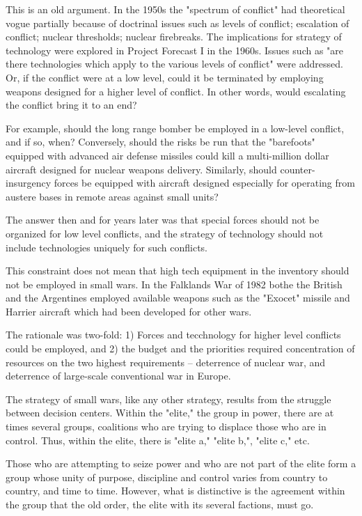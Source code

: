 This is an old argument. In the 1950s the "spectrum of conflict" had theoretical vogue partially because of doctrinal issues such as levels of conflict; escalation of conflict; nuclear thresholds; nuclear firebreaks. The implications for strategy of technology were explored in Project Forecast I in the 1960s. Issues such as "are there technologies which apply to the various levels of conflict" were addressed. Or, if the conflict were at a low level, could it be terminated by employing weapons designed for a higher level of conflict. In other words, would escalating the conflict bring it to an end?

For example, should the long range bomber be employed in a low-level conflict, and if so, when? Conversely, should the risks be run that the "barefoots" equipped with advanced air defense missiles could kill a multi-million dollar aircraft designed for nuclear weapons delivery. Similarly, should counter-insurgency forces be equipped with aircraft designed especially for operating from austere bases in remote areas against small units?

The answer then and for years later was that special forces should not be organized for low level conflicts, and the strategy of technology should not include technologies uniquely for such conflicts.

\begin{mdframed}[backgroundcolor=black!10]
This constraint does not mean that high tech equipment in the inventory should not be employed in small wars. In the Falklands War of 1982 bothe the British and the Argentines employed available weapons such as the "Exocet" missile and Harrier aircraft which had been developed for other wars.
\end{mdframed}

The rationale was two-fold: 1) Forces and tecchnology for higher level conflicts could be employed, and 2) the budget and the priorities required concentration of resources on the two highest requirements -- deterrence of nuclear war, and deterrence of large-scale conventional war in Europe.

The strategy of small wars, like any other strategy, results from the struggle between decision centers. Within the "elite," the group in power, there are at times several groups, coalitions who are trying to displace those who are in control. Thus, within the elite, there is "elite a," "elite b,", "elite c," etc.

Those who are attempting to seize power and who are not part of the elite form a group whose unity of purpose, discipline and control varies from country to country, and time to time. However, what is distinctive is the agreement within the group that the old order, the elite with its several factions, must go.

